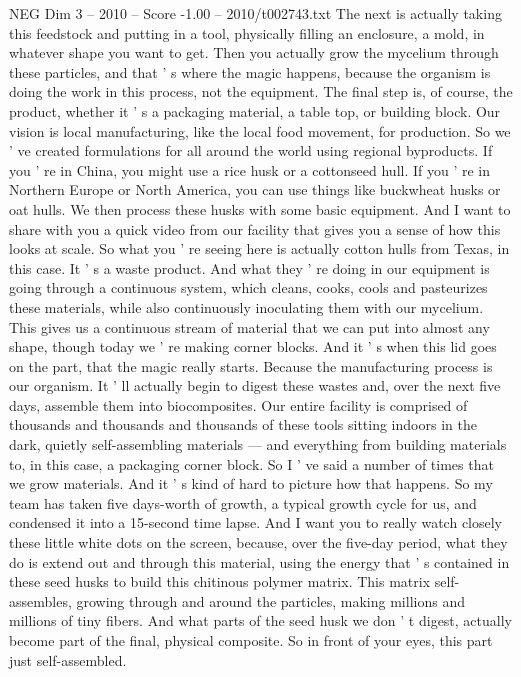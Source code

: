 \begin{textsample}{NEG Dim 3 – 2010 – Score -1.00 – 2010/t002743.txt}
The next is actually taking this feedstock and putting in a tool, physically filling an enclosure, a mold, in whatever shape you want to get.
Then you actually grow the mycelium through these particles, and that ' s where the magic happens, because the organism is doing the work in this process, not the equipment.
The final step is, of course, the product, whether it ' s a packaging material, a table top, or building block.
Our vision is local manufacturing, like the local food movement, for production.
So we ' ve created formulations for all around the world using regional byproducts.
If you ' re in China, you might use a rice husk or a cottonseed hull.
If you ' re in Northern Europe or North America, you can use things like buckwheat husks or oat hulls.
We then process these husks with some basic equipment.
And I want to share with you a quick video from our facility that gives you a sense of how this looks at scale.
So what you ' re seeing here is actually cotton hulls from Texas, in this case.
It ' s a waste product.
And what they ' re doing in our equipment is going through a continuous system, which cleans, cooks, cools and pasteurizes these materials, while also continuously inoculating them with our mycelium.
This gives us a continuous stream of material that we can put into almost any shape, though today we ' re making corner blocks.
And it ' s when this lid goes on the part, that the magic really starts.
Because the manufacturing process is our organism.
It ' ll actually begin to digest these wastes and, over the next five days, assemble them into biocomposites.
Our entire facility is comprised of thousands and thousands and thousands of these tools sitting indoors in the dark, quietly self-assembling materials — and everything from building materials to, in this case, a packaging corner block.
So I ' ve said a number of times that we grow materials.
And it ' s kind of hard to picture how that happens.
So my team has taken five days-worth of growth, a typical growth cycle for us, and condensed it into a 15-second time lapse.
And I want you to really watch closely these little white dots on the screen, because, over the five-day period, what they do is extend out and through this material, using the energy that ' s contained in these seed husks to build this chitinous polymer matrix.
This matrix self-assembles, growing through and around the particles, making millions and millions of tiny fibers.
And what parts of the seed husk we don ' t digest, actually become part of the final, physical composite.
So in front of your eyes, this part just self-assembled.

\end{textsample}

